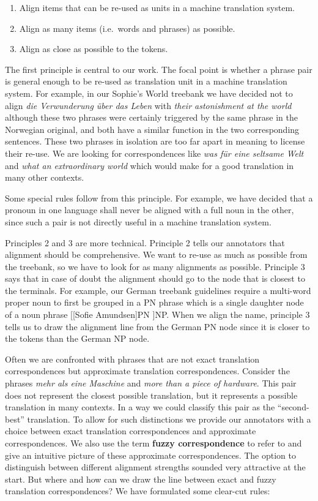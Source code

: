 \documentclass[output=paper]{LSP/langsci}
\begin{document}
\begin{enumerate}
\item Align items that can be re-used as units in a machine translation system. 
\item Align as many items (i.e.~words and phrases) as possible. 
\item Align as close as possible to the tokens.
\end{enumerate} 

The first principle is central to our work. The focal point is whether a phrase pair is general enough to be re-used as translation unit in a machine translation system. For example, in our Sophie's World treebank we have decided not to align \textit{die Verwunderung über das Leben} with \textit{their astonishment at the world} although these two phrases were certainly triggered by the same phrase in the Norwegian original, and both have a similar function in the two corresponding sentences. These two phrases in isolation are too far apart in meaning to license their re-use. We are looking for correspondences like \textit{was für eine seltsame} \textit{Welt }and \textit{what an extraordinary world }which would make for a good translation in many other contexts. 

Some special rules follow from this principle. For example, we have decided that a pronoun in one language shall never be aligned with a full noun in the other, since such a pair is not directly useful in a machine translation system. 

\newpage 
Principles 2 and 3 are more technical. Principle 2 tells our annotators that alignment should be comprehensive. We want to re-use as much as possible from the treebank, so we have to look for as many alignments as possible. Principle 3 says that in case of doubt the alignment should go to the node that is closest to the terminals. For example, our German treebank guidelines require a multi-word proper noun to first be grouped in a PN phrase which is a single daughter node of a noun phrase [[Sofie Amundsen]PN ]NP. When we align the name, principle 3 tells us to draw the alignment line from the German PN node since it is closer to the tokens than the German NP node. 

Often we are confronted with phrases that are not exact translation correspondences but approximate translation correspondences. Consider the phrases \textit{mehr als eine Maschine} and \textit{more than a piece of hardware}. This pair does not represent the closest possible translation, but it represents a possible translation in many contexts. In a way we could classify this pair as the ``second-best'' translation. To allow for such distinctions we provide our annotators with a choice between exact translation correspondences and approximate correspondences. We also use the term \textbf{fuzzy correspondence} to refer to and give an intuitive picture of these approximate correspondences. The option to distinguish between different alignment strengths sounded very attractive at the start. But where and how can we draw the line between exact and fuzzy translation correspondences? We have formulated some clear-cut rules: 
\end{document}

